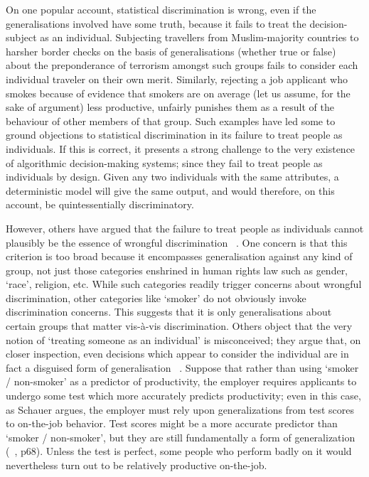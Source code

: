 \documentclass[pmlr,twocolumn,10pt]{jmlr}%
\begin{document}
On one popular account, statistical discrimination is wrong, even if the generalisations involved have some truth, because it fails to treat the decision-subject as an individual. Subjecting travellers from Muslim-majority countries to harsher border checks on the basis of generalisations (whether true or false) about the preponderance of terrorism amongst such groups fails to consider each individual traveler on their own merit. Similarly, rejecting a job applicant who smokes because of evidence that smokers are on average (let us assume, for the sake of argument) less productive, unfairly punishes them as a result of the behaviour of other members of that group. Such examples have led some to ground objections to statistical discrimination in its failure to treat people as individuals. If this is correct, it presents a strong challenge to the very existence of algorithmic decision-making systems; since they fail to treat people as individuals by design. Given any two individuals with the same attributes, a deterministic model will give the same output, and would therefore, on this account, be quintessentially discriminatory.

However, others have argued that the failure to treat people as individuals cannot plausibly be the essence of wrongful discrimination ~\cite{schauer2009profiles,dworkin1981equality,lippert2014born}. One concern is that this criterion is too broad because it encompasses generalisation against any kind of group, not just those categories enshrined in human rights law such as gender, `race', religion, etc. While such categories readily trigger concerns about wrongful discrimination, other categories like `smoker' do not obviously invoke discrimination concerns. This suggests that it is only generalisations about certain groups that matter vis-à-vis discrimination. Others object that the very notion of `treating someone as an individual' is misconceived; they argue that, on closer inspection, even decisions which appear to consider the individual are in fact a disguised form of generalisation ~\cite{schauer2009profiles}. Suppose that rather than using `smoker / non-smoker' as a predictor of productivity, the employer requires applicants to undergo some test which more accurately predicts productivity; even in this case, as Schauer argues, the employer must rely upon generalizations from test scores to on-the-job behavior. Test scores might be a more accurate predictor than `smoker / non-smoker', but they are still fundamentally a form of generalization (~\cite{schauer2009profiles}, p68). Unless the test is perfect, some people who perform badly on it would nevertheless turn out to be relatively productive on-the-job.
\end{document}
